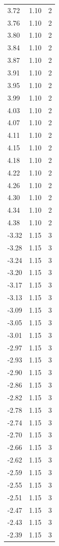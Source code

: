 \begin{longtable}{lrr}
  3.72 & 1.10 & 2 \\
  3.76 & 1.10 & 2 \\
  3.80 & 1.10 & 2 \\
  3.84 & 1.10 & 2 \\
  3.87 & 1.10 & 2 \\
  3.91 & 1.10 & 2 \\
  3.95 & 1.10 & 2 \\
  3.99 & 1.10 & 2 \\
  4.03 & 1.10 & 2 \\
  4.07 & 1.10 & 2 \\
  4.11 & 1.10 & 2 \\
  4.15 & 1.10 & 2 \\
  4.18 & 1.10 & 2 \\
  4.22 & 1.10 & 2 \\
  4.26 & 1.10 & 2 \\
  4.30 & 1.10 & 2 \\
  4.34 & 1.10 & 2 \\
  4.38 & 1.10 & 2 \\
  -3.32 & 1.15 & 3 \\
  -3.28 & 1.15 & 3 \\
  -3.24 & 1.15 & 3 \\
  -3.20 & 1.15 & 3 \\
  -3.17 & 1.15 & 3 \\
  -3.13 & 1.15 & 3 \\
  -3.09 & 1.15 & 3 \\
  -3.05 & 1.15 & 3 \\
  -3.01 & 1.15 & 3 \\
  -2.97 & 1.15 & 3 \\
  -2.93 & 1.15 & 3 \\
  -2.90 & 1.15 & 3 \\
  -2.86 & 1.15 & 3 \\
  -2.82 & 1.15 & 3 \\
  -2.78 & 1.15 & 3 \\
  -2.74 & 1.15 & 3 \\
  -2.70 & 1.15 & 3 \\
  -2.66 & 1.15 & 3 \\
  -2.62 & 1.15 & 3 \\
  -2.59 & 1.15 & 3 \\
  -2.55 & 1.15 & 3 \\
  -2.51 & 1.15 & 3 \\
  -2.47 & 1.15 & 3 \\
  -2.43 & 1.15 & 3 \\
  -2.39 & 1.15 & 3 \\

\end{longtable}
